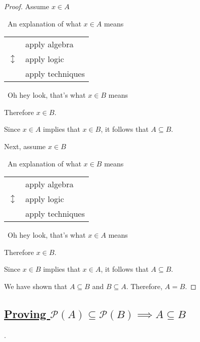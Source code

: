 \documentclass{amsart} %
\theoremstyle{definition} %
\theoremstyle{proposition} %
\theoremstyle{remark} %
\begin{document}
\begin{proof}
      Assume $x \in A$

            \begin{center}
                  \guillemotleft\ An explanation of what $ x \in A$ means \guillemotright
            \end{center}

            \begin{center}
            \begin{tabular}{r l}
                  \multirow{3}{*}{\huge $\updownarrow$} & apply algebra \\
                  & apply logic \\
                  & apply techniques \\
            \end{tabular}
            \end{center}

            \begin{center}
                  \guillemotleft\ Oh hey look, that's what $x \in B$ means \guillemotright
            \end{center}

            Therefore $x \in B$.

            Since $x \in A$ implies that $x \in B$, it follows that $A \subseteq B$.

            \bigskip

            Next, assume $x \in B$

            \begin{center}
                  \guillemotleft\ An explanation of what $ x \in B$ means \guillemotright
            \end{center}

            \begin{center}
            \begin{tabular}{r l}
                  \multirow{3}{*}{\huge $\updownarrow$} & apply algebra \\
                  & apply logic \\
                  & apply techniques \\
            \end{tabular}
            \end{center}

            \begin{center}
                  \guillemotleft\ Oh hey look, that's what $x \in A$ means \guillemotright
            \end{center}

            Therefore $x \in B$.

            Since $x \in B$ implies that $x \in A$, it follows that $A \subseteq B$.


            We have shown that $A \subseteq B$ and $B \subseteq A$. Therefore, $A = B$.

\end{proof}












\bigskip \bigskip \bigskip \bigskip

\subsection{\underline{Proving $ \mathcal{P}(A) \subseteq \mathcal{P}(B) \implies A \subseteq B$}}.
\end{document}
